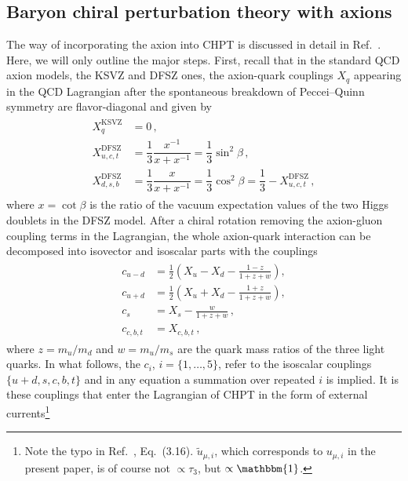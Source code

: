 \documentclass[reprint,amssymb,amsmath,floatfix,aps,prd,groupedaddress,nofootinbib]{revtex4-2}
\begin{document}
\subsection{Baryon chiral perturbation theory with axions}

The way of incorporating the axion into CHPT is discussed in detail in Ref.~\cite{Vonk:2020zfh}. Here, we will
only outline the major steps. First, recall that in the standard QCD axion models, the KSVZ and DFSZ ones,
the axion-quark couplings $X_q$ appearing in the QCD Lagrangian after the spontaneous breakdown of
Peccei--Quinn symmetry are flavor-diagonal and given by 
\begin{align}
\label{eq:couplignconstantsmodeldepending}
\begin{split}
X_q^\mathrm{KSVZ} & = 0 \, , \\
X_{u,c,t}^\mathrm{DFSZ} & = \dfrac{1}{3} \dfrac{x^{-1}}{x+x^{-1}} = \dfrac{1}{3}\sin^2\beta\, , \\
X_{d,s,b}^\mathrm{DFSZ} &=\dfrac{1}{3} \dfrac{x}{x+x^{-1}}=\dfrac{1}{3}\cos^2\beta = \dfrac{1}{3}
- X_{u,c,t}^\mathrm{DFSZ} \, , 
\end{split}
\end{align}
where $x = \cot \beta$ is the ratio of the vacuum expectation values of the two Higgs doublets in the
DFSZ model. After a chiral rotation removing the axion-gluon coupling terms in the Lagrangian, the whole axion-quark
interaction can be decomposed into isovector and isoscalar parts with  the couplings
\begin{align}
\label{eq:cuds}
\begin{split}
c_{u-d} &= \frac{1}{2}\left(X_u-X_d-\frac{1-z}{1+z+w}\right)  ,  \\
c_{u+d} &= \frac{1}{2}\left(X_u+X_d-\frac{1+z}{1+z+w}\right)  , \\
c_s & = X_s-\frac{w}{1+z+w}\, , \\
c_{c,b,t} & =X_{c,b,t}\,,
\end{split}
\end{align}
where $z=m_u/m_d$ and $w=m_u/m_s$ are the quark mass ratios of the three light quarks. In what follows,
the $c_i$, $i=\{1,\dots,5\}$, refer to the isoscalar couplings $\{u+d,s,c,b,t\}$ and in any  equation a
summation over repeated $i$ is implied. It is these couplings that enter the Lagrangian of CHPT in the
form of external currents\footnote{Note the typo in Ref.~\cite{Vonk:2020zfh}, Eq.~(3.16). $\tilde{u}_{\mu,i}$, which
corresponds to $u_{\mu,i}$ in the present paper, is of course not $\propto \tau_3$, but $\propto\mathbbm{1}$.}
\end{document}
